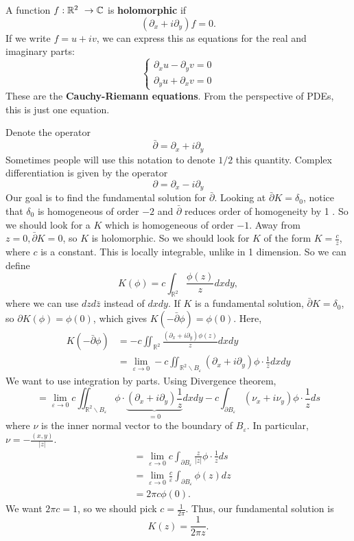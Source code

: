 \begin{definition}
A function $f:\mathbb{R}^2\ \to \mathbb{C}$ is \textbf{holomorphic} if 
\[
    (\partial_x + i \partial_y)f = 0.
\]
If we write $f=u+i v$, we can express this as equations for the real and imaginary parts:
$$
\left\{\begin{array}{l}
\partial_{x} u-\partial_{y} v=0 \\
\partial_{y} u+\partial_{x} v=0
\end{array}\right.
$$
These are the \textbf{Cauchy-Riemann equations}. From the perspective of PDEs, this is just one equation.
\end{definition}
Denote the operator
$$
\bar{\partial}=\partial_{x}+i \partial_{y}
$$
Sometimes people will use this notation to denote $1 / 2$ this quantity. Complex differentiation is given by the operator
$$
\partial=\partial_{x}-i \partial_{y}
$$
Our goal is to find the fundamental solution for $\bar{\partial}$.
Looking at $\bar{\partial} K=\delta_{0}$, notice that $\delta_{0}$ is homogeneous of order $-2$ and $\bar{\partial}$ reduces order of homogeneity by 1 . So we should look for a $K$ which is homogeneous of order $-1$. Away from $z=0, \bar{\partial} K=0$, so $K$ is holomorphic. So we should look for $K$ of the form $K=\frac{c}{z}$, where $c$ is a constant. This is locally integrable, unlike in 1 dimension. So we can define
$$
K(\phi)=c \int_{\mathbb{R}^{2}} \frac{\phi(z)}{z} d x d y,
$$
where we can use $d z d \bar{z}$ instead of $d x d y .$ If $K$ is a fundamental solution, $\bar{\partial} K=\delta_{0}$, so $\partial K(\phi)=\phi(0)$, which gives $K(-\bar{\partial} \phi)=\phi(0) .$ Here,
$$
\begin{aligned}
K(-\bar{\partial} \phi) &=-c \iint_{\mathbb{R}^{2}} \frac{\left(\partial_{x}+i \partial_{y}\right) \phi(z)}{z} d x d y \\
&=\lim _{\varepsilon \rightarrow 0}-c \iint_{\mathbb{R}^{2} \backslash B_{\varepsilon}}\left(\partial_{x}+i \partial_{y}\right) \phi \cdot \frac{1}{z} d x d y
\end{aligned}
$$
We want to use integration by parts. Using Divergence theorem,
$$
=\lim _{\varepsilon \rightarrow 0} c \iint_{\mathbb{R}^{2} \backslash B_{\varepsilon}} \phi \cdot \underbrace{\left(\partial_{x}+i \partial_{y}\right) \frac{1}{z}}_{=0} d x d y-c \int_{\partial B_{\varepsilon}}\left(\nu_{x}+i \nu_{y}\right) \phi \cdot \frac{1}{z} d s
$$
where $\nu$ is the inner normal vector to the boundary of $B_{\varepsilon} .$ In particular, $\nu=-\frac{(x, y)}{|z|}$.
$$
\begin{aligned}
&=\lim _{\varepsilon \rightarrow 0} c \int_{\partial B_{\varepsilon}} \frac{z}{|z|} \phi \cdot \frac{1}{z} d s \\
&=\lim _{\varepsilon \rightarrow 0} \frac{c}{\varepsilon} \int_{\partial B_{\varepsilon}} \phi(z) d z \\
&=2 \pi c \phi(0).
\end{aligned}
$$
We want $2 \pi c=1$, so we should pick $c=\frac{1}{2 \pi}$. Thus, our fundamental solution is
$$
K(z)=\frac{1}{2 \pi z}.
$$

